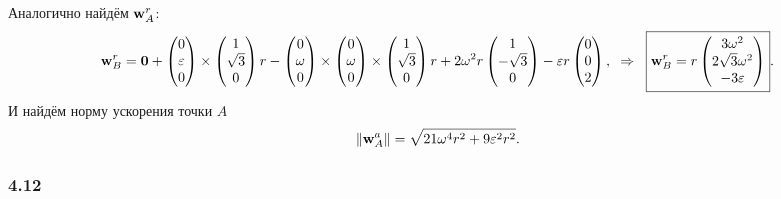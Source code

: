 Аналогично найдём $\mbox{\boldmath $\mathrm{w}$}^r_A$:
$$
    \mbox{\boldmath $\mathrm{w}$}^r_B = \mbox{\boldmath $0$}  + \begin{pmatrix}
        0 \\ \varepsilon \\ 0 
    \end{pmatrix} \times \begin{pmatrix}
        1 \\ \sqrt{3} \\ 0
    \end{pmatrix} r - \begin{pmatrix}
        0 \\ \omega \\ 0
    \end{pmatrix} \times
    \begin{pmatrix}
        0 \\ \omega \\ 0
    \end{pmatrix} \times
    \begin{pmatrix}
        1 \\ \sqrt{3} \\ 0
    \end{pmatrix} r +
    2 \omega^2 r \begin{pmatrix}
        1 \\ -\sqrt{3} \\ 0
    \end{pmatrix} - \varepsilon r \begin{pmatrix}
        0 \\ 0 \\ 2
    \end{pmatrix},
    \hspace{0.2cm} \Rightarrow \hspace{0.2cm} 
    \boxed{\mbox{\boldmath $\mathrm{w}$}^r_B = r \begin{pmatrix}
        3 \omega^2 \\ 2 \sqrt{3} \omega^2 \\ - 3 \varepsilon 
    \end{pmatrix}}.
$$
И найдём норму ускорения точки $A$
$$
    \|\mbox{\boldmath $\mathrm{w}$}_A^a\| = \sqrt{21 \omega^4 r^2 + 9 \varepsilon^2 r^2}.
$$


\subsubsection*{4.12}

